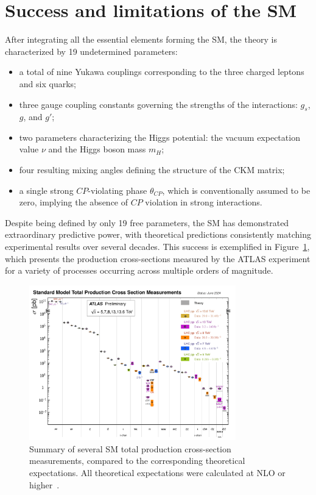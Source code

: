 \section{Success and limitations of the SM}
\label{sec:BSM}
After integrating all the essential elements forming the SM, the theory is characterized by 19 undetermined parameters:
\begin{itemize}
  \item a total of nine Yukawa couplings corresponding to the three charged leptons and six quarks;
  \item three gauge coupling constants governing the strengths of the interactions: \( g_s \), \( g \), and \( g' \);
  \item two parameters characterizing the Higgs potential: the vacuum expectation value \(\nu\) and the Higgs boson mass \(m_H\);
  \item four resulting mixing angles defining the structure of the CKM matrix;
  \item a single strong $CP$-violating phase \(\theta_{CP}\), which is conventionally assumed to be zero, implying the absence of $CP$ violation in strong interactions.
\end{itemize}
Despite being defined by only 19 free parameters, the SM has demonstrated extraordinary predictive power, with theoretical predictions consistently matching experimental results over several decades. This success is exemplified in Figure~\ref{fig:totalxsect}, which presents the production cross-sections measured by the ATLAS experiment for a variety of processes occurring across multiple orders of magnitude.
\begin{figure}[htbp]
  \centering
  \includegraphics[width=0.8\textwidth]{images/totalxsect.pdf}
  \caption{Summary of several SM total production cross-section measurements, compared to the corresponding theoretical expectations. All theoretical expectations were calculated at NLO or higher~\cite{ATL-PHYS-PUB-2024-011}.}
  \label{fig:totalxsect}
\end{figure}


